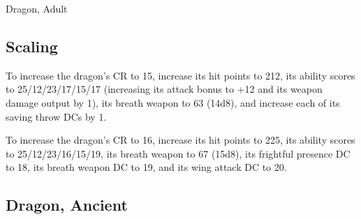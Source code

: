 \begin{DndMonster}[width=\textwidth + 8pt]{Dragon, Adult}
\begin{multicols}{2}
\subsection{Scaling}
To increase the dragon's CR to 15, increase its hit points to 212, its ability scores to 25/12/23/17/15/17 (increasing its attack bonus to +12 and its weapon damage output by 1), its breath weapon to 63 (14d8), and increase each of its saving throw DCs by 1.

To increase the dragon's CR to 16, increase its hit points to 225, its ability scores to 25/12/23/16/15/19, its breath weapon to 67 (15d8), its frightful presence DC to 18, its breath weapon DC to 19, and its wing attack DC to 20.
\end{multicols}
\end{DndMonster}
\subsection{Dragon, Ancient}
